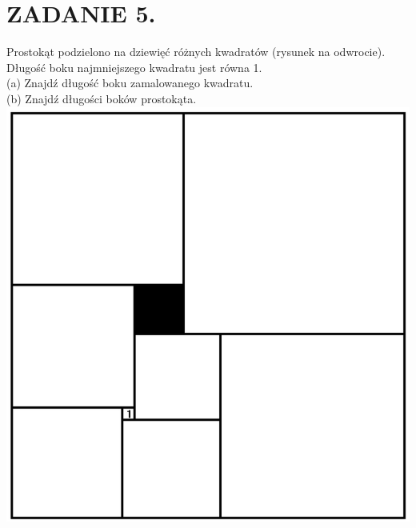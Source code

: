 \documentclass[10pt]{article}
\begin{document}
\section*{ZADANIE 5.}
Prostokąt podzielono na dziewięć różnych kwadratów (rysunek na odwrocie). Długość boku najmniejszego kwadratu jest równa 1.\\
(a) Znajdź długość boku zamalowanego kwadratu.\\
(b) Znajdź długości boków prostokąta.\\
\includegraphics[max width=\textwidth, center]{2024_11_21_26b6528d4939a170073ag-2}
\end{document}
